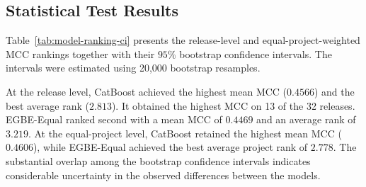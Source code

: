 \documentclass[conference]{IEEEtran}
\begin{document}
\subsection{Statistical Test Results}
\label{subsec:statistical-results}

Table~\ref{tab:model-ranking-ci} presents the release-level and
equal-project-weighted MCC rankings together with their \(95\%\)
bootstrap confidence intervals. The intervals were estimated using
20,000 bootstrap resamples.

\begin{table}[H]
\caption{Model Rankings and Bootstrap Confidence Intervals}
\label{tab:model-ranking-ci}
\centering
\setlength{\tabcolsep}{2.0pt}
\end{table}

At the release level, CatBoost achieved the highest mean MCC
(\(0.4566\)) and the best average rank (\(2.813\)). It obtained the
highest MCC on 13 of the 32 releases. EGBE-Equal ranked second with a
mean MCC of \(0.4469\) and an average rank of \(3.219\). At the
equal-project level, CatBoost retained the highest mean MCC
(\(0.4606\)), while EGBE-Equal achieved the best average project rank
of \(2.778\). The substantial overlap among the bootstrap confidence
intervals indicates considerable uncertainty in the observed
differences between the models.
\end{document}
